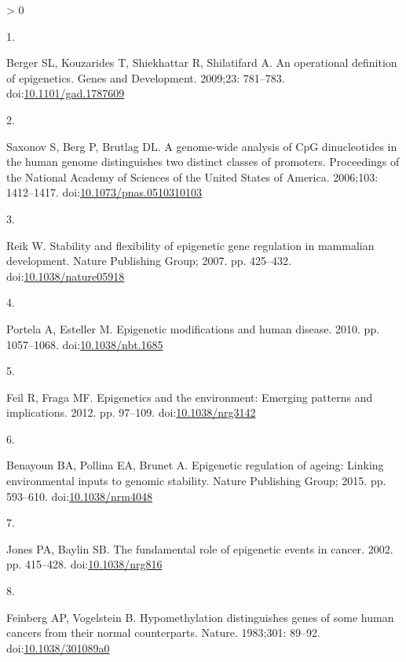 \documentclass[10pt,letterpaper]{article}
\newlength{\csllabelwidth}
\newlength{\cslhangindent}
\newenvironment{CSLReferences}[2] %
 {%
  \setlength{\parindent}{0pt}
  \ifodd #1 \everypar{\setlength{\hangindent}{\cslhangindent}}\ignorespaces\fi
  \ifnum #2 > 0
  \setlength{\parskip}{#2\baselineskip}
  \fi
 }%
 {}
\newcommand{\CSLLeftMargin}[1]{\parbox[t]{\csllabelwidth}{#1}}
\newcommand{\CSLRightInline}[1]{\parbox[t]{\linewidth - \csllabelwidth}{#1}\break}
\begin{document}
\hypertarget{refs}{}
\begin{CSLReferences}{0}{0}
\leavevmode\hypertarget{ref-Berger2009}{}%
\CSLLeftMargin{1. }
\CSLRightInline{Berger SL, Kouzarides T, Shiekhattar R, Shilatifard A.
{An operational definition of epigenetics}. Genes and Development.
2009;23: 781--783.
doi:\href{https://doi.org/10.1101/gad.1787609}{10.1101/gad.1787609}}

\leavevmode\hypertarget{ref-Saxonov2006}{}%
\CSLLeftMargin{2. }
\CSLRightInline{Saxonov S, Berg P, Brutlag DL. {A genome-wide analysis
of CpG dinucleotides in the human genome distinguishes two distinct
classes of promoters}. Proceedings of the National Academy of Sciences
of the United States of America. 2006;103: 1412--1417.
doi:\href{https://doi.org/10.1073/pnas.0510310103}{10.1073/pnas.0510310103}}

\leavevmode\hypertarget{ref-Reik2007}{}%
\CSLLeftMargin{3. }
\CSLRightInline{Reik W. {Stability and flexibility of epigenetic gene
regulation in mammalian development}. Nature Publishing Group; 2007. pp.
425--432.
doi:\href{https://doi.org/10.1038/nature05918}{10.1038/nature05918}}

\leavevmode\hypertarget{ref-Portela2010}{}%
\CSLLeftMargin{4. }
\CSLRightInline{Portela A, Esteller M. {Epigenetic modifications and
human disease}. 2010. pp. 1057--1068.
doi:\href{https://doi.org/10.1038/nbt.1685}{10.1038/nbt.1685}}

\leavevmode\hypertarget{ref-Feil2012}{}%
\CSLLeftMargin{5. }
\CSLRightInline{Feil R, Fraga MF. {Epigenetics and the environment:
Emerging patterns and implications}. 2012. pp. 97--109.
doi:\href{https://doi.org/10.1038/nrg3142}{10.1038/nrg3142}}

\leavevmode\hypertarget{ref-Benayoun2015}{}%
\CSLLeftMargin{6. }
\CSLRightInline{Benayoun BA, Pollina EA, Brunet A. {Epigenetic
regulation of ageing: Linking environmental inputs to genomic
stability}. Nature Publishing Group; 2015. pp. 593--610.
doi:\href{https://doi.org/10.1038/nrm4048}{10.1038/nrm4048}}

\leavevmode\hypertarget{ref-Jones2002}{}%
\CSLLeftMargin{7. }
\CSLRightInline{Jones PA, Baylin SB. {The fundamental role of epigenetic
events in cancer}. 2002. pp. 415--428.
doi:\href{https://doi.org/10.1038/nrg816}{10.1038/nrg816}}

\leavevmode\hypertarget{ref-Feinberg1983}{}%
\CSLLeftMargin{8. }
\CSLRightInline{Feinberg AP, Vogelstein B. {Hypomethylation
distinguishes genes of some human cancers from their normal
counterparts}. Nature. 1983;301: 89--92.
doi:\href{https://doi.org/10.1038/301089a0}{10.1038/301089a0}}


\end{CSLReferences}
\end{document}
